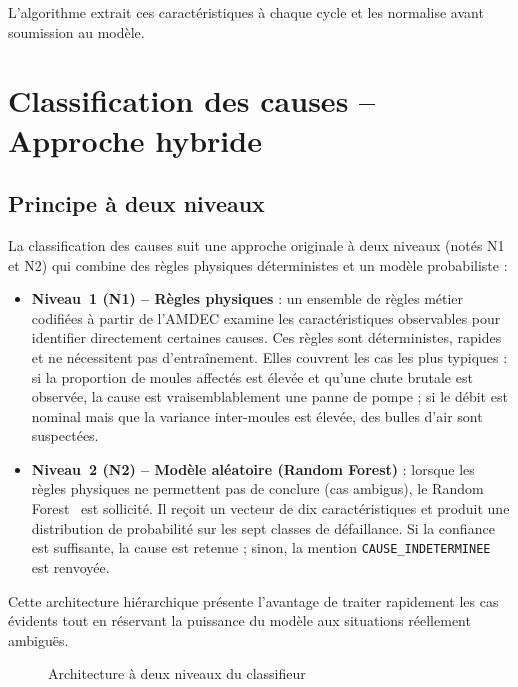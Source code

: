 L'algorithme extrait ces caractéristiques à chaque cycle et les normalise avant soumission au modèle.

\section{Classification des causes -- Approche hybride}

\subsection{Principe à deux niveaux}

La classification des causes suit une approche originale à deux niveaux (notés N1 et N2) qui combine des règles physiques déterministes et un modèle probabiliste :

\begin{itemize}
  \item \textbf{Niveau~1 (N1) -- Règles physiques} : un ensemble de règles métier codifiées à partir de l'AMDEC examine les caractéristiques observables pour identifier directement certaines causes. Ces règles sont déterministes, rapides et ne nécessitent pas d'entraînement. Elles couvrent les cas les plus typiques : si la proportion de moules affectés est élevée et qu'une chute brutale est observée, la cause est vraisemblablement une panne de pompe ; si le débit est nominal mais que la variance inter-moules est élevée, des bulles d'air sont suspectées.
  \item \textbf{Niveau~2 (N2) -- Modèle aléatoire (Random Forest)} : lorsque les règles physiques ne permettent pas de conclure (cas ambigus), le Random Forest~\cite{bib32} est sollicité. Il reçoit un vecteur de dix caractéristiques et produit une distribution de probabilité sur les sept classes de défaillance. Si la confiance est suffisante, la cause est retenue ; sinon, la mention \texttt{CAUSE\_INDETERMINEE} est renvoyée.
\end{itemize}

Cette architecture hiérarchique présente l'avantage de traiter rapidement les cas évidents tout en réservant la puissance du modèle aux situations réellement ambiguës.

\begin{figure}[htbp]
  \centering
  \caption{Architecture à deux niveaux du classifieur}
\end{figure}

